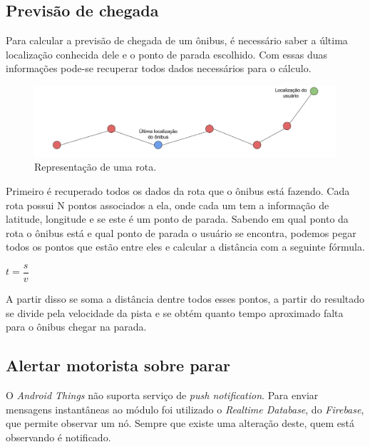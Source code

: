 \documentclass[
	12pt,				%
	oneside,			%
	a4paper,			%
	brazil				%
]{abntex2}
\begin{document}
{\subsection{Previsão de chegada}

Para calcular a previsão de chegada de um ônibus, é necessário saber a última localização conhecida dele e o ponto de parada escolhido. Com essas duas informações pode-se recuperar todos dados necessários para o cálculo.

\begin{figure}[H]
\centering
\includegraphics[width=15cm, center]{images/previsao-rota}
\caption{Representação de uma rota.}
\label{Rotulo}
\end{figure}

Primeiro é recuperado todos os dados da rota que o ônibus está fazendo. Cada rota possui N pontos associados a ela, onde cada um tem a informação de latitude, longitude e se este é um ponto de parada. Sabendo em qual ponto da rota o ônibus está e qual ponto de parada o usuário se encontra, podemos pegar todos os pontos que estão entre eles e calcular a distância com a seguinte fórmula.

\begin{center}
$t = \dfrac{s}{v}$ 
\end{center}

A partir disso se soma a distância dentre todos esses pontos, a partir do resultado se divide pela velocidade da pista e se obtém quanto tempo aproximado falta para o ônibus chegar na parada.

\subsection{Alertar motorista sobre parar}

O \textit{Android Things} não suporta serviço de \textit{push notification}. Para enviar mensagens instantâneas ao módulo foi utilizado o \textit{Realtime Database}, do \textit{Firebase}, que permite observar um nó. Sempre que existe uma alteração deste, quem está observando é notificado.

}
\end{document}
